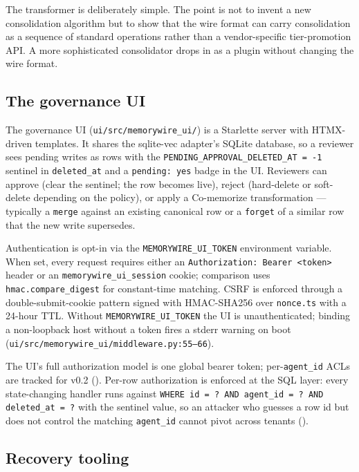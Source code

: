 \documentclass[11pt,letterpaper,twocolumn]{article}
\begin{document}
The transformer is deliberately simple. The point is not to invent a new consolidation algorithm but to show that the wire format can carry consolidation as a sequence of standard operations rather than a vendor-specific tier-promotion API. A more sophisticated consolidator drops in as a plugin without changing the wire format.

\subsection{The governance UI}
\label{sec:impl-ui}

The governance UI (\texttt{ui/src/memorywire\_ui/}) is a Starlette server with HTMX-driven templates. It shares the sqlite-vec adapter's SQLite database, so a reviewer sees pending writes as rows with the \texttt{PENDING\_APPROVAL\_DELETED\_AT = -1} sentinel in \texttt{deleted\_at} and a \texttt{pending: yes} badge in the UI. Reviewers can approve (clear the sentinel; the row becomes live), reject (hard-delete or soft-delete depending on the policy), or apply a Co-memorize transformation --- typically a \texttt{merge} against an existing canonical row or a \texttt{forget} of a similar row that the new write supersedes.

Authentication is opt-in via the \texttt{MEMORYWIRE\_UI\_TOKEN} environment variable. When set, every request requires either an \texttt{Authorization: Bearer <token>} header or an \texttt{memorywire\_ui\_session} cookie; comparison uses \texttt{hmac.compare\_digest} for constant-time matching. CSRF is enforced through a double-submit-cookie pattern signed with HMAC-SHA256 over \texttt{nonce.ts} with a 24-hour TTL. Without \texttt{MEMORYWIRE\_UI\_TOKEN} the UI is unauthenticated; binding a non-loopback host without a token fires a stderr warning on boot (\texttt{ui/src/memorywire\_ui/middleware.py:55--66}).

The UI's full authorization model is one global bearer token; per-\texttt{agent\_id} ACLs are tracked for v0.2 (). Per-row authorization is enforced at the SQL layer: every state-changing handler runs against \texttt{WHERE id = ? AND agent\_id = ? AND deleted\_at = ?} with the sentinel value, so an attacker who guesses a row id but does not control the matching \texttt{agent\_id} cannot pivot across tenants ().

\subsection{Recovery tooling}
\label{sec:impl-recovery}
\end{document}
